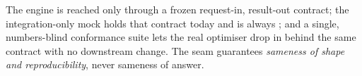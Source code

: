 \begin{keyidea}
The engine is reached only through a frozen request-in, result-out contract; the integration-only mock holds that contract today and is always ; and a single, numbers-blind conformance suite lets the real optimiser drop in behind the same contract with no downstream change. The seam guarantees \emph{sameness of shape and reproducibility}, never sameness of answer.
\end{keyidea}
